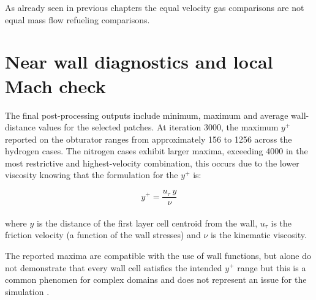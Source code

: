 As already seen in previous chapters the equal velocity gas comparisons are not equal mass flow refueling comparisons.

\section{Near wall diagnostics and local Mach check}
\label{sec:near_wall_verification}

The final post-processing outputs include minimum, maximum and average wall-distance values for the selected patches. At iteration 3000, the maximum $y^+$ reported on the obturator ranges from approximately 156 to 1256 across the hydrogen cases. The nitrogen cases exhibit larger maxima, exceeding 4000 in the most restrictive and highest-velocity combination, this occurs due to the lower viscosity knowing that the formulation for the $y^+$ is:

\begin{equation}
y^+=\frac{u_\tau \ y}{\nu}
\label{eq:y+}
\end{equation}\\

where $y$ is the distance of the first layer cell centroid from the wall, $u_\tau$ is the friction velocity (a function of the wall stresses) and $\nu$ is the kinematic viscosity.

The reported maxima are compatible with the use of wall functions, but alone do not demonstrate that every wall cell satisfies the intended $y^+$ range but this is a common phenomen for complex domains and does not represent an issue for the simulation \cite{menter1994,openfoam_user}.\\

